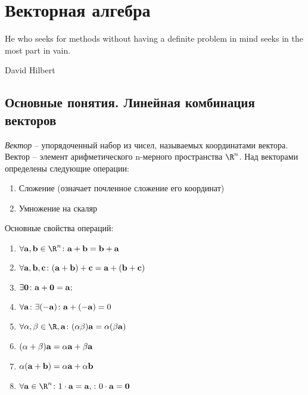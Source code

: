 \section{Векторная алгебра}
\label{vector}

\epigraph{He who seeks for methods without having a definite problem 
  in mind seeks in the most part in vain.}{David Hilbert}

\subsection{Основные понятия. Линейная комбинация векторов}

\begin{df}
  \emph{Вектор} -- упорядоченный набор из чисел, называемых координатами вектора. Вектор -- элемент арифметического n-мерного пространства $\R^n$. Над векторами определены следующие операции:
  \begin{enumerate}
    \item Сложение (означает почленное сложение его координат)
    \item Умножение на скаляр
  \end{enumerate}
\end{df}

Основные свойства операций:

\begin{enumerate}
  \item $\forall \ab,\bb\in\R^n\spc \ab+\bb=\bb+\ab$
  \item $\forall {\bf a},{\bf b},{\bf c} \colon ({\bf a}+{\bf b})+{\bf c}={\bf a}+({\bf b}+{\bf c})$
  \item $\exists \mathbf 0\colon {\bf a}+\mathbf 0={\bf a};$
  \item $\forall {\bf a}\colon\exists(-{\bf a})\colon {\bf a}+(-{\bf a})=0$
  \item $\forall\al,\beta\in\R, \ab\colon (\al\beta)\ab=\al(\beta \ab)$
  \item $(\alpha+\beta){\bf a}=\alpha {\bf a}+\beta {\bf a}$
  \item $\alpha({\bf a}+{\bf b})=\alpha {\bf a}+\alpha {\bf b}$
  \item $\forall\ab\in\R^n\spc1\cdot\ab=\ab,\spc 0\cdot\ab=\mathbf 0$
\end{enumerate}

